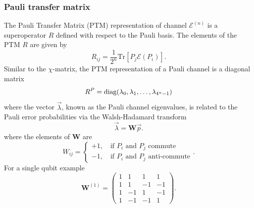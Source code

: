\documentclass{article}
\begin{document}
\subsubsection*{Pauli transfer matrix}
The Pauli Transfer Matrix (PTM) representation of channel $\mathcal{E}^{(n)}$ is a superoperator $R$ defined with respect to the Pauli basis. The elements of the PTM $R$ are given by
\begin{equation}
    R_{ij}=\frac{1}{2^n}\text{Tr}[P_j\mathcal{E}(P_i)].
\end{equation}
Similar to the $\chi$-matrix, the PTM representation of a Pauli channel is a diagonal matrix
\begin{equation}
    R^P = \text{diag}(\lambda_0, \lambda_1, \dots, \lambda_{4^n-1}) \\
\end{equation}
where the vector $\vec{\lambda}$, known as the Pauli channel eigenvalues, is related to the Pauli error probabilities via the Walsh-Hadamard transform
\begin{equation}
    \vec{\lambda}=\bm{W}\vec{p}.
\end{equation}
where the elements of $\bm{W}$ are
\begin{equation}
    W_{ij} = 
    \begin{cases}
        +1, \quad \text{if $P_i$ and $P_j$ commute}\\
        -1, \quad \text{if $P_i$ and $P_j$ anti-commute}
    \end{cases}.
\end{equation}
For a single qubit example
\begin{equation}
        \bm{W}^{(1)}
        =
        \begin{pmatrix}
        1 & 1 & 1 & 1\\
        1 & 1 & -1 & -1\\
        1 & -1 & 1 & -1\\
        1 & -1 & -1 & 1
        \end{pmatrix}.
\end{equation}
\end{document}
